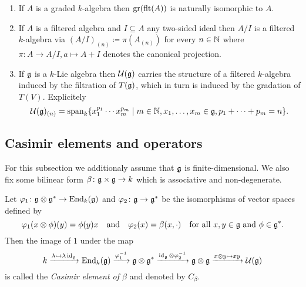 \begin{expls}
 \begin{enumerate}[leftmargin=*]
  \item
   If $A$ is a graded $k$-algebra then $\operatorname{gr}(\operatorname{flt}(A))$ is naturally isomorphic to $A$.
  \item 
   If $A$ is a filtered algebra and $I \subseteq A$ any two-sided ideal then $A/I$ is a filtered $k$-algebra via $(A/I)_{(n)} \coloneqq \pi(A_{(n)})$ for every $n \in \mathbb{N}$ where $\pi \colon A \to A/I, a \mapsto A + I$ denotes the canonical projection.
  \item
   If $\mathfrak{g}$ is a $k$-Lie algebra then $\mathcal{U}(\mathfrak{g})$ carries the structure of a filtered $k$-algebra induced by the filtration of $T(\mathfrak{g})$, which in turn is induced by the gradation of $T(V)$. Explicitely
   \[
    \mathcal{U}(\mathfrak{g})_{(n)}
    = \operatorname{span}_k \{x_1^{p_1} \dotsm x_m^{p_m} \mid m \in \mathbb{N}, x_1, \dotsc, x_m \in \mathfrak{g}, p_1 + \dotsb + p_m = n\}.
   \]
 \end{enumerate}
\end{expls}





























\subsection{Casimir elements and operators}
For this subsection we additionaly assume that $\mathfrak{g}$ is finite-dimensional. We also fix some bilinear form $\beta \colon \mathfrak{g} \times \mathfrak{g} \to k$ which is associative and non-degenerate.


\begin{defi}\label{defi: definition of Casimir element}
 Let $\varphi_1 \colon \mathfrak{g} \otimes \mathfrak{g}^* \to \operatorname{End}_k(\mathfrak{g})$ and $\varphi_2 \colon \mathfrak{g} \to \mathfrak{g}^*$ be the isomorphisms of vector spaces defined by
 \[
  \varphi_1(x \otimes \phi)(y) = \phi(y) x
  \quad\text{and}\quad
  \varphi_2(x) = \beta(x, \cdot)
  \quad\text{for all $x,y \in \mathfrak{g}$ and $\phi \in \mathfrak{g}^*$}.
 \]
 Then the image of $1$ under the map
 \begin{equation}\label{eqn: Casimir without coordinates}
  k
  \xrightarrow{\lambda \mapsto \lambda \operatorname{id}_{\mathfrak{g}}}
  \operatorname{End}_k(\mathfrak{g})
  \xrightarrow{\varphi_1^{-1}}
  \mathfrak{g} \otimes \mathfrak{g}^*
  \xrightarrow{\operatorname{id}_{\mathfrak{g}} \otimes \varphi_2^{-1}}
  \mathfrak{g} \otimes \mathfrak{g}
  \xrightarrow{x \otimes y \mapsto x y}
  \mathcal{U}(\mathfrak{g})
 \end{equation}
 is called the \emph{Casimir element of $\beta$} and denoted by $C_\beta$.
\end{defi}


